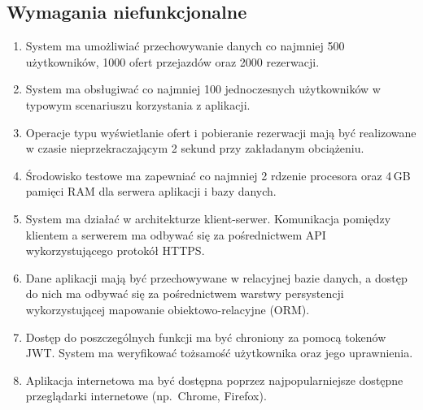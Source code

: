 \subsection{Wymagania niefunkcjonalne}
\begin{enumerate}
    \item System ma umożliwiać przechowywanie danych co najmniej 500 użytkowników, 1000 ofert przejazdów oraz 2000 rezerwacji.

    \item System ma obsługiwać co najmniej 100 jednoczesnych użytkowników w typowym scenariuszu korzystania z aplikacji.

    \item Operacje typu wyświetlanie ofert i pobieranie rezerwacji mają być realizowane w czasie nieprzekraczającym 2 sekund przy zakładanym obciążeniu.

    \item Środowisko testowe ma zapewniać co najmniej 2 rdzenie procesora oraz 4\,GB pamięci RAM dla serwera aplikacji i bazy danych.

    \item System ma działać w architekturze klient-serwer. Komunikacja pomiędzy klientem a serwerem ma odbywać się za pośrednictwem API wykorzystującego protokół HTTPS.

    \item Dane aplikacji mają być przechowywane w relacyjnej bazie danych, a dostęp do nich ma odbywać się za pośrednictwem warstwy persystencji wykorzystującej mapowanie obiektowo-relacyjne (ORM).

    \item Dostęp do poszczególnych funkcji ma być chroniony za pomocą tokenów JWT. System ma weryfikować tożsamość użytkownika oraz jego uprawnienia.

    \item Aplikacja internetowa ma być dostępna poprzez najpopularniejsze dostępne przeglądarki internetowe (np.\ Chrome, Firefox).
\end{enumerate}

